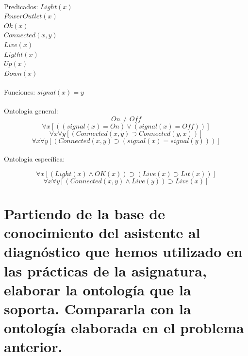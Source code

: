 \documentclass[10pt, a4paper,spanish]{article}
\begin{document}
		\paragraph{}
		Predicados:
		$Light(x)$ \\
		$PowerOutlet(x)$ \\
		$Ok(x)$ \\
		$Connected(x, y)$ \\
		$Live(x)$ \\
		$Ligtht(x)$ \\
		$Up(x)$ \\
		$Down(x)$ \\

		\paragraph{}
		Funciones:
		$signal(x) = y$ \\




		\paragraph{}
		Ontología general:
		\[ On \neq Off \]
		\[ \forall x [((signal(x) = On) \lor (signal(x) = Off))] \]
		\[ \forall x \forall y [(Connected(x, y) \supset Connected(y, x))] \]
		\[ \forall x \forall y [(Connected(x, y) \supset (signal(x) = signal(y)))] \]

		\paragraph{}
		Ontología específica:

		\[ \forall x [(Light(x) \land OK(x)) \supset (Live(x) \supset Lit(x))] \]
		\[ \forall x \forall y [(Connected(x,y) \land Live(y)) \supset Live(x)] \]



	\section{Partiendo de la base de conocimiento del asistente al diagnóstico que hemos utilizado en las prácticas de la asignatura, elaborar la ontología que la soporta. Compararla con la ontología elaborada en el problema anterior.}

		\paragraph{}
\end{document}
